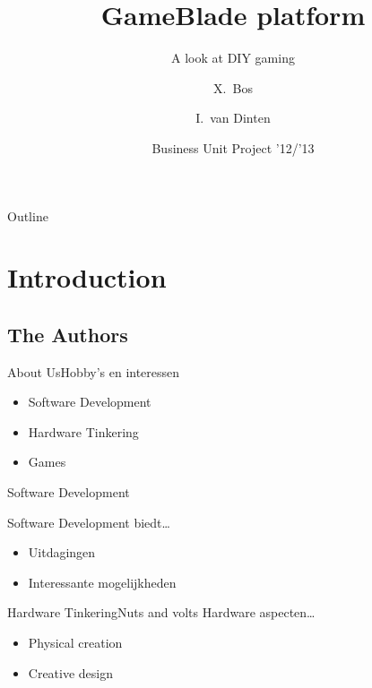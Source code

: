 \documentclass{beamer}
\title[GameBlade] %
{GameBlade platform}
\subtitle
{A look at DIY gaming} %
\author[Xander Bos, Imara van Dinten] %
{X.~Bos\and I.~van Dinten}
\institute[TI Hogeschool van Amsterdam] %
{
  Technical Computing\\
  Hogeschool van Amsterdam
}
\date[Short Occasion] %
{Business Unit Project '12/'13}
\begin{document}
\begin{frame}
  \titlepage
\end{frame}

\begin{frame}{Outline}
  \tableofcontents
\end{frame}




\section{Introduction}

\subsection[Authors]{The Authors}

\begin{frame}{About Us}{Hobby's en interessen}

	\begin{itemize}
		\item
			Software Development
			\pause
		\item
			Hardware Tinkering
			\pause
		\item
			Games
	\end{itemize}
\end{frame}

\begin{frame}{Software Development}

Software Development biedt\dots
\pause
\begin{itemize}
	\item
		Uitdagingen
		\pause
	\item
		Interessante mogelijkheden			
\end{itemize}
\end{frame}

\begin{frame}{Hardware Tinkering}{Nuts and volts}
Hardware aspecten\dots
\pause
\begin{itemize}
	\item
		Physical creation
		\pause
	\item
		Creative design
\end{itemize}
\end{frame}
\end{document}
